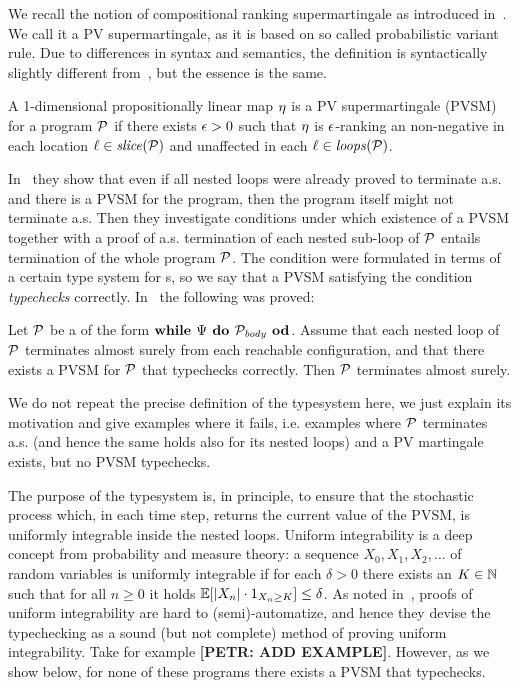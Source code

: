 We recall the notion of compositional ranking supermartingale as introduced in~\cite{HolgerPOPL}. We call it a PV supermartingale, as it is based on so called probabilistic variant rule. Due to differences in syntax and semantics, the definition is syntactically slightly different from~\cite{HolgerPOPL}, but the essence is the same. 

\begin{definition}[PV-supermartingale]
A 1-dimensional propositionally linear map $\eta$ is a PV supermartingale (PVSM) for a program $\mathcal{P}$ if there exists $\epsilon>0$ such that $\eta$ is $\epsilon$-ranking an non-negative in each location $\ell\in\mathit{slice}{(\mathcal{P})}$ and unaffected in each $\ell\in\mathit{loops}(\mathcal{P})$.
\end{definition}

In~\cite{HolgerPOPL} they show that even if all nested loops were already proved to terminate a.s. and there is a PVSM for the program, then the program itself might not terminate a.s. Then they investigate conditions under which existence of a PVSM together with a proof of a.s. termination of each nested sub-loop of $\mathcal{P}$ entails termination of the whole program $\mathcal{P}$. The condition were formulated in terms of a certain type system for \PP{}s, so we say that a PVSM satisfying the condition \emph{typechecks} correctly. In~\cite{HolgerPOPL} the following was proved:

\begin{theorem}
\label{thm:holger-comp}
Let $\mathcal{P}$ be a \PP{} of the form $\textbf{while } \Psi \textbf{ do } 
\mathcal{P}_{\mathit{body}} \textbf{ od}$. Assume that each nested loop of $\mathcal{P}$ terminates almost surely from each reachable configuration, and that there exists a PVSM for $\mathcal{P}$ that typechecks correctly. Then $\mathcal{P}$ terminates almost surely.
\end{theorem}

We do not repeat the precise definition of the typesystem here, we just explain its motivation and give examples where it fails, i.e. examples where $\mathcal{P}$ terminates a.s. (and hence the same holds also for its nested loops) and a PV martingale exists, but no PVSM typechecks.  

The purpose of the typesystem is, in principle, to ensure that the stochastic process which, in each time step, returns the current value of the PVSM, is uniformly integrable inside the nested loops. Uniform integrability is a deep concept from probability and measure theory: a sequence $X_0,X_1,X_2,\dots$ of random variables is uniformly integrable if for each $\delta>0$ there exists an $K\in \mathbb{N}$ such that for all $n\geq 0$ it holds $\mathbb{E}[|X_n|\cdot{1}_{X_n \geq K}]\leq \delta$. As noted in~\cite{HolgerPOPL}, proofs of uniform integrability are hard to (semi)-automatize, and hence they devise the typechecking as a sound (but not complete) method of proving uniform integrability. Take for example \textbf{[PETR: ADD EXAMPLE]}. However, as we show below, for none of these programs there exists a PVSM that typechecks. 


